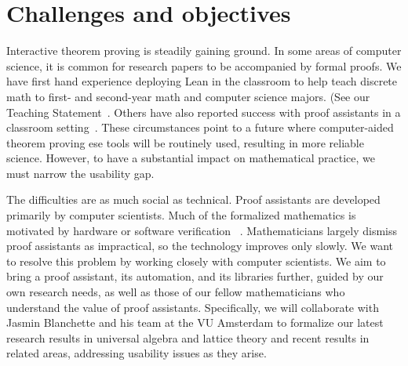 \documentclass[11pt]{amsart}  %
\begin{document}










\section{Challenges and objectives}
Interactive theorem proving is steadily gaining ground. In some areas
of computer science, it is common for research papers to be accompanied by formal proofs. We have first hand experience deploying Lean in the classroom to help teach discrete math to first- and second-year math and computer science majors. (See our Teaching Statement~\cite{demeo:2018-teaching}.  Others have also reported success with proof assistants in a classroom setting~\cite{nipkow:2012,pierce:2009}. These circumstances point to a future where computer-aided theorem proving ese tools will be routinely used, resulting in more reliable science.
However, to have a substantial impact on mathematical practice, we must narrow the usability gap.

The difficulties are as much social as technical. Proof assistants are developed primarily by computer scientists. Much of the formalized mathematics is motivated by hardware or software verification
~\cite{boldo:2013,harrison:2003,hurd:2003,russinoff:1999}. Mathematicians largely dismiss proof assistants as impractical, so the technology improves only slowly. We want to resolve this problem by working closely with computer scientists. We aim to bring a proof assistant, its automation, and its libraries further, guided by our own research needs, as well as those of our fellow mathematicians who understand the value of proof assistants. Specifically, we will collaborate with Jasmin Blanchette and his team at the VU Amsterdam to formalize our latest research results in universal algebra and lattice theory and recent results in related areas, addressing usability issues as they arise.
\end{document}
